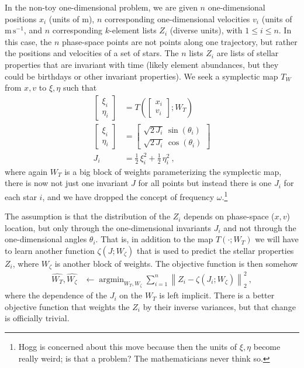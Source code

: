 \documentclass{article}
\DeclareMathOperator*{\argmin}{argmin}
\newcommand{\norm}[1]{\left\lVert#1\right\rVert_2^2}
\newcommand{\unit}[1]{\mathrm{#1}}
\newcommand{\m}{\unit{m}}
\newcommand{\s}{\unit{s}}
\newcommand{\ps}{\s^{-1}}
\newcommand{\mps}{\m\,\ps}
\begin{document}
In the non-toy one-dimensional problem, we are given $n$ one-dimensional positions $x_i$ (units of $\m$), $n$ corresponding one-dimensional velocities $v_i$ (units of $\mps$, and $n$ corresponding $k$-element lists $Z_i$ (diverse units), with $1\leq i\leq n$.
In this case, the $n$ phase-space points are not points along one trajectory, but rather the positions and velocities of a set of stars.
The $n$ lists $Z_i$ are lists of stellar properties that are invariant with time (likely element abundances, but they could be birthdays or other invariant properties).
We seek a symplectic map $T_W$ from $x, v$ to $\xi, \eta$ such that
\begin{align}
    \begin{bmatrix}\xi_i \\ \eta_i\end{bmatrix} &= T(\begin{bmatrix}x_i \\ v_i\end{bmatrix}; W_T)\\
    \begin{bmatrix}\xi_i \\ \eta_i\end{bmatrix} &= \begin{bmatrix}\sqrt{2\,J_i}\,\sin(\theta_i) \\ \sqrt{2\,J_i}\,\cos(\theta_i)\end{bmatrix} \\
    J_i &= \frac{1}{2}\,\xi_i^2 + \frac{1}{2}\,\eta_i^2 ~,
\end{align}
where again $W_T$ is a big block of weights parameterizing the symplectic map,
there is now not just one invariant $J$ for all points but instead there is one $J_i$ for each star $i$,
and we have dropped the concept of frequency $\omega$.\footnote{Hogg is concerned about this move because then the units of $\xi,\eta$ become really weird; is that a problem? The mathematicians never think so.}

The assumption is that the distribution of the $Z_i$ depends on phase-space ($x, v$) location, but only through the one-dimensional invariants $J_i$ and not through the one-dimensional angles $\theta_i$.
That is, in addition to the map $T(\cdot;W_T)$ we will have to learn another function $\zeta(J;W_\zeta)$ that is used to predict the stellar properties $Z_i$, where $W_\zeta$ is another block of weights.
The objective function is then somehow
\begin{align}
    \hat{W_T},\hat{W_\zeta} &\leftarrow \argmin_{W_T, W_\zeta} \sum_{i=1}^n\norm{Z_i - \zeta(J_i; W_\zeta)} ~,
\end{align}
where the dependence of the $J_i$ on the $W_T$ is left implicit.
There is a better objective function that weights the $Z_i$ by their inverse variances, but that change is officially trivial.
\end{document}
